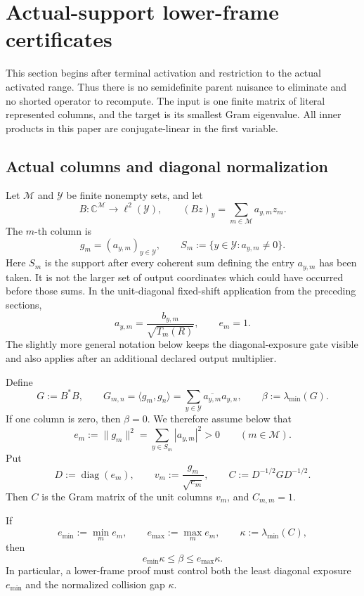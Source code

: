 \section{Actual-support lower-frame certificates}
\label{sec:tpc66-support-lower-frames}

This section begins after terminal activation and restriction to the actual
activated range.  Thus there is no semidefinite parent nuisance to eliminate
and no shorted operator to recompute.  The input is one finite matrix of
literal represented columns, and the target is its smallest Gram eigenvalue.
All inner products in this paper are conjugate-linear in the first variable.

\subsection{Actual columns and diagonal normalization}

Let \(\mathcal M\) and \(\mathcal Y\) be finite nonempty sets, and let
\[
 B:\mathbb C^{\mathcal M}\longrightarrow\ell^2(\mathcal Y),
 \qquad
 (Bz)_y=\sum_{m\in\mathcal M}a_{y,m}z_m .
\]
The \(m\)-th column is
\[
 g_m=(a_{y,m})_{y\in\mathcal Y},
 \qquad
 S_m:=\{y\in\mathcal Y:a_{y,m}\ne0\}.
\]
Here \(S_m\) is the support after every coherent sum defining the entry
\(a_{y,m}\) has been taken.  It is not the larger set of output coordinates
which could have occurred before those sums.
In the unit-diagonal fixed-shift application from the preceding sections,
\[
 a_{y,m}=\frac{b_{y,m}}{\sqrt{T_m(R)}},
 \qquad e_m=1.
\]
The slightly more general notation below keeps the diagonal-exposure gate
visible and also applies after an additional declared output multiplier.

Define
\begin{equation}
 G:=B^*B,
 \qquad
 G_{m,n}=\langle g_m,g_n\rangle
 =\sum_{y\in\mathcal Y}\overline{a_{y,m}}a_{y,n},
 \qquad
 \beta:=\lambda_{\min}(G).
 \label{eq:tpc66-basic-gram}
\end{equation}
If one column is zero, then \(\beta=0\).  We therefore assume below that
\begin{equation}
 e_m:=\|g_m\|^2=\sum_{y\in S_m}|a_{y,m}|^2>0
 \qquad(m\in\mathcal M).
 \label{eq:tpc66-row-exposure}
\end{equation}
Put
\[
 D:=\operatorname{diag}(e_m),
 \qquad
 v_m:=\frac{g_m}{\sqrt{e_m}},
 \qquad
 C:=D^{-1/2}GD^{-1/2}.
\]
Then \(C\) is the Gram matrix of the unit columns \(v_m\), and
\(C_{m,m}=1\).

\begin{proposition}
\label{prop:tpc66-diagonal-normalization}
If
\[
 e_{\min}:=\min_m e_m,
 \qquad
 e_{\max}:=\max_m e_m,
 \qquad
 \kappa:=\lambda_{\min}(C),
\]
then
\begin{equation}
 \boxed{
 e_{\min}\kappa
 \le \beta
 \le e_{\max}\kappa .}
 \label{eq:tpc66-diagonal-normalization-bound}
\end{equation}
In particular, a lower-frame proof must control both the least diagonal
exposure \(e_{\min}\) and the normalized collision gap \(\kappa\).
\end{proposition}

